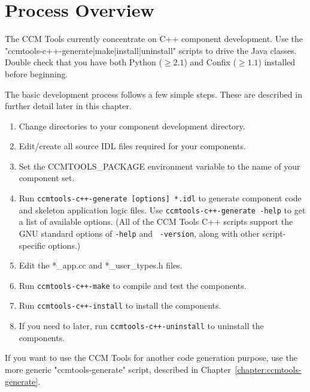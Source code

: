 
\chapter{Process Overview}

The CCM Tools currently concentrate on C++ component development. Use the
"ccmtools-c++-{generate|make|install|uninstall}" scripts to drive the Java
classes. Double check that you have both Python ($\ge 2.1$) and Confix ($\ge
1.1$) installed before beginning.

The basic development process follows a few simple steps. These are described in
further detail later in this chapter.

\begin{enumerate}
\item Change directories to your component development directory.
\item Edit/create all source IDL files required for your components.
\item Set the CCMTOOLS\_PACKAGE environment variable to the name of your
      component set.
\item Run {\tt ccmtools-c++-generate [options] *.idl} to generate component code
      and skeleton application logic files. Use {\tt ccmtools-c++-generate
      -\-help} to get a list of available options. (All of the CCM Tools C++
      scripts support the GNU standard options of {\tt -\-help} and {\tt
      -\-version}, along with other script-specific options.)
\item Edit the *\_app.cc and *\_user\_types.h files.
\item Run {\tt ccmtools-c++-make} to compile and test the components.
\item Run {\tt ccmtools-c++-install} to install the components.
\item If you need to later, run {\tt ccmtools-c++-uninstall} to uninstall the
      components.
\end{enumerate}

If you want to use the CCM Tools for another code generation purpose, use the
more generic "ccmtools-generate" script, described in
Chapter~\ref{chapter:ccmtools-generate}.

